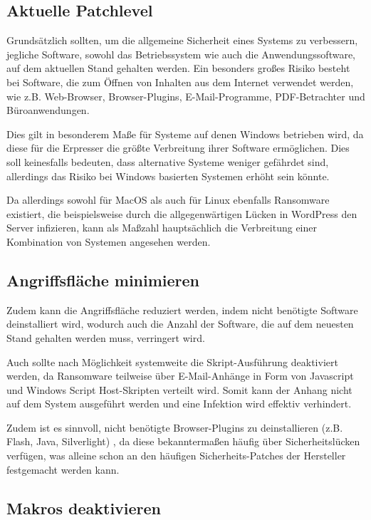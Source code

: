 \subsection{Aktuelle Patchlevel}

	 Grundsätzlich sollten, um die allgemeine Sicherheit eines Systems zu verbessern, jegliche Software, sowohl das Betriebssystem wie auch die Anwendungssoftware, auf dem aktuellen Stand gehalten werden. Ein besonders großes Risiko besteht bei Software, die zum Öffnen von Inhalten aus dem Internet verwendet werden, wie z.B. Web-Browser, Browser-Plugins, E-Mail-Programme, PDF-Betrachter und Büroanwendungen. \cite{bsi:ransome}

Dies gilt in besonderem Maße für Systeme auf denen Windows betrieben wird, da diese für die Erpresser die größte Verbreitung ihrer Software ermöglichen. Dies soll keinesfalls bedeuten, dass alternative Systeme weniger gefährdet sind, allerdings das Risiko bei Windows basierten Systemen erhöht sein könnte.

Da allerdings sowohl für MacOS als auch für Linux ebenfalls Ransomware existiert, die beispielsweise durch die allgegenwärtigen Lücken in WordPress den Server infizieren, kann als Maßzahl hauptsächlich die Verbreitung einer Kombination von Systemen angesehen werden.
	 
\subsection{Angriffsfläche minimieren}
Zudem kann die Angriffsfläche reduziert werden, indem nicht benötigte Software deinstalliert wird, wodurch auch die Anzahl der Software, die auf dem neuesten Stand gehalten werden muss, verringert wird.
	
Auch sollte nach Möglichkeit systemweite die Skript-Ausführung deaktiviert werden, da Ransomware teilweise über E-Mail-Anhänge in Form von Javascript und Windows Script Host-Skripten verteilt wird. Somit kann der Anhang nicht auf dem System ausgeführt werden und eine Infektion wird effektiv verhindert. \cite{bsi:ransome}
	
Zudem ist es sinnvoll, nicht benötigte Browser-Plugins zu deinstallieren (z.B. Flash, Java, Silverlight) \cite{bsi:ransome} , da diese bekanntermaßen häufig über Sicherheitslücken verfügen, was alleine schon an den häufigen Sicherheits-Patches der Hersteller festgemacht werden kann.  
	
\subsection{Makros deaktivieren}


